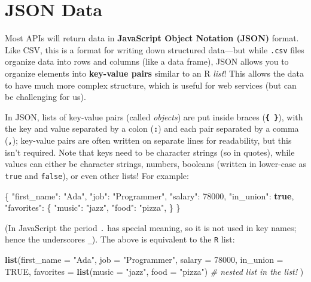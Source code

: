 \documentclass[]{book}
\newenvironment{Shaded}{\begin{snugshade}}{\end{snugshade}}
\newcommand{\KeywordTok}[1]{\textcolor[rgb]{0.13,0.29,0.53}{\textbf{#1}}}
\newcommand{\DataTypeTok}[1]{\textcolor[rgb]{0.13,0.29,0.53}{#1}}
\newcommand{\DecValTok}[1]{\textcolor[rgb]{0.00,0.00,0.81}{#1}}
\newcommand{\StringTok}[1]{\textcolor[rgb]{0.31,0.60,0.02}{#1}}
\newcommand{\CommentTok}[1]{\textcolor[rgb]{0.56,0.35,0.01}{\textit{#1}}}
\newcommand{\OtherTok}[1]{\textcolor[rgb]{0.56,0.35,0.01}{#1}}
\newcommand{\FunctionTok}[1]{\textcolor[rgb]{0.00,0.00,0.00}{#1}}
\newcommand{\NormalTok}[1]{#1}
\theoremstyle{definition}
\theoremstyle{definition}
\theoremstyle{remark}
\begin{document}
\hypertarget{json}{\section{JSON Data}\label{json}}

Most APIs will return data in \textbf{JavaScript Object Notation (JSON)}
format. Like CSV, this is a format for writing down structured
data---but while \texttt{.csv} files organize data into rows and columns
(like a data frame), JSON allows you to organize elements into
\textbf{key-value pairs} similar to an R \emph{list}! This allows the
data to have much more complex structure, which is useful for web
services (but can be challenging for us).

In JSON, lists of key-value pairs (called \emph{objects}) are put inside
braces (\textbf{\texttt{\{\ \}}}), with the key and value separated by a
colon (\textbf{\texttt{:}}) and each pair separated by a comma
(\textbf{\texttt{,}}); key-value pairs are often written on separate
lines for readability, but this isn't required. Note that keys need to
be character strings (so in quotes), while values can either be
character strings, numbers, booleans (written in lower-case as
\texttt{true} and \texttt{false}), or even other lists! For example:

\begin{Shaded}
\begin{Highlighting}[]
\FunctionTok{\{}
  \DataTypeTok{"first_name"}\FunctionTok{:} \StringTok{"Ada"}\FunctionTok{,}
  \DataTypeTok{"job"}\FunctionTok{:} \StringTok{"Programmer"}\FunctionTok{,}
  \DataTypeTok{"salary"}\FunctionTok{:} \DecValTok{78000}\FunctionTok{,}
  \DataTypeTok{"in_union"}\FunctionTok{:} \KeywordTok{true}\FunctionTok{,}
  \DataTypeTok{"favorites"}\FunctionTok{:} \FunctionTok{\{}
    \DataTypeTok{"music"}\FunctionTok{:} \StringTok{"jazz"}\FunctionTok{,}
    \DataTypeTok{"food"}\FunctionTok{:} \StringTok{"pizza"}\FunctionTok{,}
  \FunctionTok{\}}
\FunctionTok{\}}
\end{Highlighting}
\end{Shaded}

(In JavaScript the period \texttt{.} has special meaning, so it is not
used in key names; hence the underscores \texttt{\_}). The above is
equivalent to the \texttt{R} list:

\begin{Shaded}
\begin{Highlighting}[]
\KeywordTok{list}\NormalTok{(}\DataTypeTok{first_name =} \StringTok{"Ada"}\NormalTok{, }\DataTypeTok{job =} \StringTok{"Programmer"}\NormalTok{, }\DataTypeTok{salary =} \DecValTok{78000}\NormalTok{, }\DataTypeTok{in_union =} \OtherTok{TRUE}\NormalTok{,}
        \DataTypeTok{favorites =} \KeywordTok{list}\NormalTok{(}\DataTypeTok{music =} \StringTok{"jazz"}\NormalTok{, }\DataTypeTok{food =} \StringTok{"pizza"}\NormalTok{)  }\CommentTok{# nested list in the list!}
\NormalTok{    )}
\end{Highlighting}
\end{Shaded}
\end{document}
